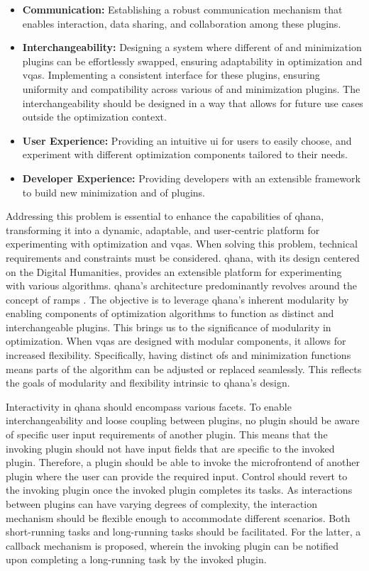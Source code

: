 \documentclass[
  a4paper,  %
  twoside,  %
  bibliography=totoc,
  headsepline,
  cleardoublepage=empty,
  parskip=half,
  draft=false
]{scrbook}
\begin{document}
\begin{itemize}
    \item \textbf{Communication:} Establishing a robust communication mechanism that enables interaction, data sharing, and collaboration among these plugins.
    \item \textbf{Interchangeability:} Designing a system where different \gls{of} and minimization plugins can be effortlessly swapped, ensuring adaptability in optimization and \glspl{vqa}.
    Implementing a consistent interface for these plugins, ensuring uniformity and compatibility across various \gls{of} and minimization plugins.
    The interchangeability should be designed in a way that allows for future use cases outside the optimization context.
    \item \textbf{User Experience:} Providing an intuitive \gls{ui} for users to easily choose, and experiment with different optimization components tailored to their needs.
    \item \textbf{Developer Experience:} Providing developers with an extensible framework to build new minimization and \gls{of} plugins.
  \end{itemize}

Addressing this problem is essential to enhance the capabilities of \gls{qhana}, transforming it into a dynamic, adaptable, and user-centric platform for experimenting with optimization and \glspl{vqa}.
When solving this problem, technical requirements and constraints must be considered.
\gls{qhana}, with its design centered on the Digital Humanities, provides an extensible platform for experimenting with various algorithms.
\gls{qhana}'s architecture predominantly revolves around the concept of \glspl{ramp} \cite{Buehler2022}.
The objective is to leverage \gls{qhana}'s inherent modularity by enabling components of optimization algorithms to function as distinct and interchangeable plugins.
This brings us to the significance of modularity in optimization.
When \glspl{vqa} are designed with modular components, it allows for increased flexibility.
Specifically, having distinct \glspl{of} and minimization functions means parts of the algorithm can be adjusted or replaced seamlessly.
This reflects the goals of modularity and flexibility intrinsic to \gls{qhana}'s design.

Interactivity in \gls{qhana} should encompass various facets.
To enable interchangeability and loose coupling between plugins, no plugin should be aware of specific user input requirements of another plugin.
This means that the invoking plugin should not have input fields that are specific to the invoked plugin.
Therefore, a plugin should be able to invoke the microfrontend of another plugin where the user can provide the required input.
Control should revert to the invoking plugin once the invoked plugin completes its tasks.
As interactions between plugins can have varying degrees of complexity, the interaction mechanism should be flexible enough to accommodate different scenarios.
Both short-running tasks and long-running tasks should be facilitated.
For the latter, a callback mechanism is proposed, wherein the invoking plugin can be notified upon completing a long-running task by the invoked plugin.
\end{document}
